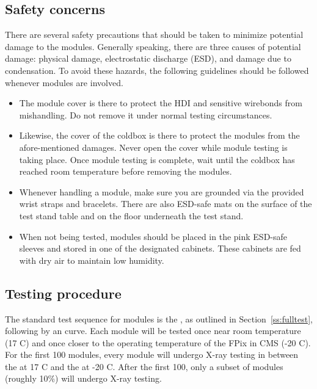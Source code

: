 \subsection{Safety concerns}
\label{ss:safety}

There are several safety precautions that should be taken to minimize potential damage to the modules.
Generally speaking, there are three causes of potential damage: 
physical damage, electrostatic discharge (ESD), and damage due to condensation.
To avoid these hazards, the following guidelines should be followed whenever modules are involved.
\begin{itemize}
\item The module cover is there to protect the HDI and sensitive wirebonds from mishandling.
Do not remove it under normal testing circumstances.
\item Likewise, the cover of the coldbox is there to protect the modules from the afore-mentioned damages.  
Never open the cover while module testing is taking place.  
Once module testing is complete, wait until the coldbox has reached room temperature before removing the modules.
\item Whenever handling a module, make sure you are grounded via the provided wrist straps and bracelets.
There are also ESD-safe mats on the surface of the test stand table and on the floor underneath the test stand.
\item When not being tested, modules should be placed in the pink ESD-safe sleeves and stored in one of the designated cabinets.
These cabinets are fed with dry air to maintain low humidity.
\end{itemize}

\subsection{Testing procedure}
\label{ss:procedure}

The standard test sequence for modules is the \fulltest, as outlined in Section~\ref{ss:fulltest}, following by an \iv curve.
Each module will be tested once near room temperature (17 C) 
and once closer to the operating temperature of the FPix in CMS (-20 C).
For the first 100 modules, every module will undergo X-ray testing in between the \fulltest at 17 C and the \fulltest at -20 C.
After the first 100, only a subset of modules (roughly 10\%) will undergo X-ray testing.

